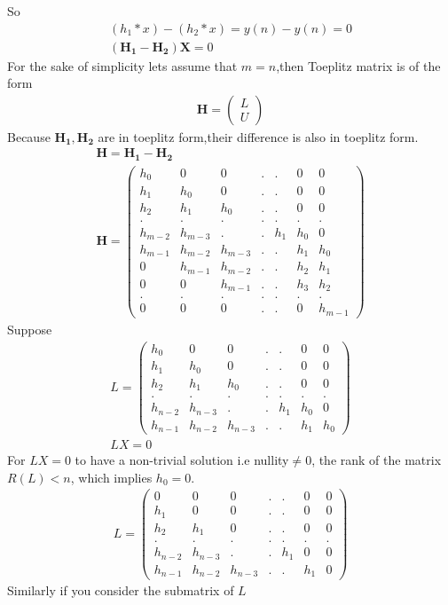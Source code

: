 \documentclass[journal,12pt,twocolumn]{IEEEtran}
\providecommand{\brak}[1]{\ensuremath{\left(#1\right)}}
\newcommand{\myvec}[1]{\ensuremath{\begin{pmatrix}#1\end{pmatrix}}}
\numberwithin{equation}{subsection}
\let\vec\mathbf
\begin{document}
So
\begin{align}
    \brak{h_1\ast x}-\brak{h_2\ast x}=y(n)-y(n)=0\\
    (\vec{H_1}-\vec{H_2})\vec{X}=0
\end{align}
For the sake of simplicity lets assume that $m=n$,then Toeplitz matrix is of the form
\begin{align}
    \vec{H}=\myvec{L\\U}
\end{align}
Because $\vec{H_1},\vec{H_2}$ are in toeplitz form,their difference is also in toeplitz form.
\begin{align}
    \vec{H}=\vec{H_1}-\vec{H_2}\\
    \vec{H}=\myvec{h_0&0&0&.&.&0&0\\h_1&h_0&0&.&.&0&0\\h_2&h_1&h_0&.&.&0&0\\.&.&.&.&.&.&.\\h_{m-2}&h_{m-3}&.&.&h_{1}&h_{0}&0\\h_{m-1}&h_{m-2}&h_{m-3}&.&.&h_{1}&h_{0}\\0&h_{m-1}&h_{m-2}&.&.&h_{2}&h_{1}\\0&0&h_{m-1}&.&.&h_{3}&h_{2}\\.&.&.&.&.&.&.\\0&0&0&.&.&0&h_{m-1}}
\end{align}
Suppose \begin{align}
    L=\myvec{h_0&0&0&.&.&0&0\\h_1&h_0&0&.&.&0&0\\h_2&h_1&h_0&.&.&0&0\\.&.&.&.&.&.&.\\h_{n-2}&h_{n-3}&.&.&h_{1}&h_{0}&0\\h_{n-1}&h_{n-2}&h_{n-3}&.&.&h_{1}&h_{0}}\label{eq:4}\\
    LX=0
\end{align}
For $LX=0$ to have a non-trivial solution i.e nullity$\neq 0$, the rank of the matrix $R(L) < n$, which implies $h_0=0$.
\begin{align}
    L=\myvec{0&0&0&.&.&0&0\\h_1&0&0&.&.&0&0\\h_2&h_1&0&.&.&0&0\\.&.&.&.&.&.&.\\h_{n-2}&h_{n-3}&.&.&h_{1}&0&0\\h_{n-1}&h_{n-2}&h_{n-3}&.&.&h_{1}&0}
\end{align}
Similarly if you consider the submatrix of $L$ 
\end{document}
